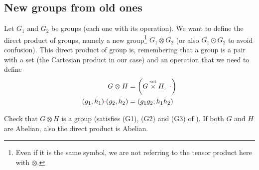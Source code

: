 \documentclass[../main.tex]{subfiles}
\begin{document}
\subsection{New groups from old ones}
\begin{example}
Let $G_1$ and $G_2$ be groups (each one with its operation). We want to define the direct product of groups, namely a new group\footnote{Even if it is the same symbol, we are not referring to the tensor product here with $\otimes$.} $G_1\otimes G_2$ (or also $G_1 \odot G_2$ to avoid confusion). This direct product of group is, remembering that a group is a pair with a set (the Cartesian product in our case) and an operation that we need to define
\[
\begin{split}
    G \otimes H &= \pqty{G\overset{\textrm{set}}{\times} H,\ {\color{red}\cdot}}\\
    (g_1,h_1){\color{red}\cdot}(g_2,h_2)&=(g_1g_2,h_1h_2)
\end{split}
\]
\end{example}
\begin{exercise}
Check that $G\otimes H$ is a group (satisfies (G1), (G2) and (G3) of ). If both $G$ and $H$ are Abelian, also the direct product is Abelian.
\end{exercise}
\end{document}
